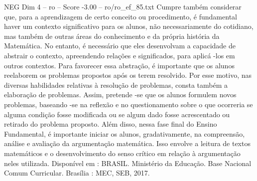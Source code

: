 \begin{textsample}{NEG Dim 4 – ro – Score -3.00 – ro/ro\_ef\_85.txt}
Cumpre também considerar que, para a aprendizagem de certo conceito ou procedimento, é fundamental haver um contexto significativo para os alunos, não necessariamente do cotidiano, mas também de outras áreas do conhecimento e da própria história da Matemática.
No entanto, é necessário que eles desenvolvam a capacidade de abstrair o contexto, apreendendo relações e significados, para aplicá -los em outros contextos.
Para favorecer essa abstração, é importante que os alunos reelaborem os problemas propostos após os terem resolvido.
Por esse motivo, nas diversas habilidades relativas à resolução de problemas, consta também a elaboração de problemas.
Assim, pretende -se que os alunos formulem novos problemas, baseando -se na reflexão e no questionamento sobre o que ocorreria se alguma condição fosse modificada ou se algum dado fosse acrescentado ou retirado do problema proposto.
Além disso, nessa fase final do Ensino Fundamental, é importante iniciar os alunos, gradativamente, na compreensão, análise e avaliação da argumentação matemática.
Isso envolve a leitura de textos matemáticos e o desenvolvimento do senso crítico em relação à argumentação neles utilizada.
Disponível em : BRASIL.
Ministério da Educação.
Base Nacional Comum Curricular.
Brasília : MEC, SEB, 2017.

\end{textsample}
